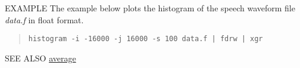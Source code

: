 \begin{options}
\end{options}

\begin{qsection}{EXAMPLE}
The example below plots the histogram of the speech waveform file
{\em data.f} in float format.
\begin{quote}
 \verb!histogram -i -16000 -j 16000 -s 100 data.f | fdrw | xgr!
\end{quote} 
\end{qsection}

\begin{qsection}{SEE ALSO}
\hyperlink{average}{average}
\end{qsection}
